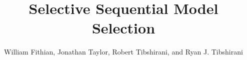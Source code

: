 \documentclass{article}
\begin{document}
\newtheorem{theorem}{Theorem}
\newtheorem{corollary}[theorem]{Corollary}
\newtheorem{lemma}[theorem]{Lemma}
\newtheorem{observation}[theorem]{Observation}
\newtheorem{proposition}[theorem]{Proposition}
\newtheorem{definition}[theorem]{Definition}
\newtheorem{claim}[theorem]{Claim}
\newtheorem{fact}[theorem]{Fact}
\newtheorem{assumption}[theorem]{Assumption}
\newtheorem{model}[theorem]{Model}

\theoremstyle{definition}
\newtheorem{example}{Example}

\newcommand{\cM}{\mathcal{M}}
\newcommand{\cH}{\mathcal{H}}
\newcommand{\cD}{\mathcal{D}}
\newcommand{\FDR}{\textnormal{FDR}}
\newcommand{\FCR}{\textnormal{FCR}}
\newcommand{\crt}{\phi}
\newcommand{\M}{\mathcal{M}}
\newcommand{\cY}{\mathcal{Y}}
\newcommand{\cX}{\mathcal{X}}
\newcommand{\cV}{\mathcal{V}}
\newcommand{\bX}{\mathbf{X}}
\newcommand{\x}{\mathbf{x}}
\newcommand{\Gv}{\;\;\big|\;\;}
\newcommand{\proj}{\cP}
\newcommand{\pow}{\text{Pow}}
\newcommand{\supp}{\text{supp}}
\newcommand{\sF}{\mathscr{F}}
\newcommand{\cF}{\mathcal{F}}
\newcommand{\sC}{\mathscr{C}}
\newcommand{\hJ}{\widehat{J}}
\newcommand{\bH}{\mathbf{H}}
\newcommand{\bM}{\mathbf{M}}
\newcommand{\tM}{\widetilde{M}}
\newcommand{\tE}{\widetilde{E}}
\newcommand{\tV}{\widetilde{V}}
\newcommand{\tR}{\widetilde{R}}
\newcommand{\tL}{\widetilde{L}}
\newcommand{\hk}{\hat{k}}
\newcommand{\hr}{\hat{r}}       
\newcommand{\cN}{\mathcal{N}}
\newcommand{\cJ}{\mathcal{J}}
\newcommand{\cL}{\mathcal{L}}
\newcommand{\leqAS}{\overset{\textrm{a.s.}}{\leq}}
\newcommand{\Err}{\mathcal{E}}
\newcommand{\RSS}{\text{RSS}}


\newcommand*\mystrut{\vrule width0pt height0pt depth1.5ex\relax}
\newcommand{\underlabel}{\underbracket[1pt][.5pt]{\mystrut \quad\;\; \sub \quad\;\; }}
\newcommand{\JTcomment}[1]{{\color{blue}{(JT: \bf \sc #1) }}}
\newcommand{\WFcomment}[1]{{\color{red}{(WF: \bf \sc #1) }}}
\newcommand{\RTcomment}[1]{{\color{green}{(RT: \bf \sc #1) }}}
\newcommand{\RJTcomment}[1]{{\color{magenta}{(RJT: \bf \sc #1) }}}
\title{Selective Sequential Model Selection}
\author{William Fithian, Jonathan Taylor, Robert Tibshirani, and Ryan J. Tibshirani} 
\maketitle
\end{document}
